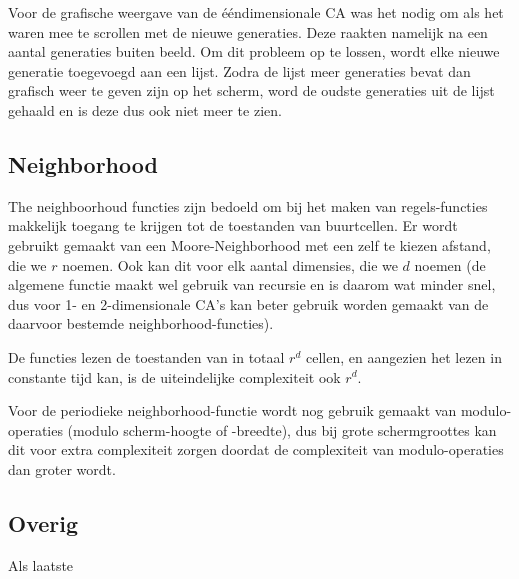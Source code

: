 \documentclass{article}
\begin{document}
Voor de grafische weergave van de ééndimensionale CA was het nodig om als het waren mee te scrollen met de nieuwe generaties. Deze raakten namelijk na een aantal generaties buiten beeld. Om dit probleem op te lossen, wordt elke nieuwe generatie toegevoegd aan een lijst. Zodra de lijst meer generaties bevat dan grafisch weer te geven zijn op het scherm, word de oudste generaties uit de lijst gehaald en is deze dus ook niet meer te zien.

\subsection{Neighborhood}
The neighboorhoud functies zijn bedoeld om bij het maken van regels-functies makkelijk toegang te krijgen tot de toestanden van buurtcellen. Er wordt gebruikt gemaakt van een Moore-Neighborhood met een zelf te kiezen afstand, die we $r$ noemen. Ook kan dit voor elk aantal dimensies, die we $d$ noemen (de algemene functie maakt wel gebruik van recursie en is daarom wat minder snel, dus voor 1- en 2-dimensionale CA's kan beter gebruik worden gemaakt van de daarvoor bestemde neighborhood-functies). 

De functies lezen de toestanden van in totaal $r^d$ cellen, en aangezien het lezen in constante tijd kan, is de uiteindelijke complexiteit ook $r^d$.

Voor de periodieke neighborhood-functie wordt nog gebruik gemaakt van modulo-operaties (modulo scherm-hoogte of -breedte), dus bij grote schermgroottes kan dit voor extra complexiteit zorgen doordat de complexiteit van modulo-operaties dan groter wordt. 

\subsection{Overig}
Als laatste 
\end{document}
